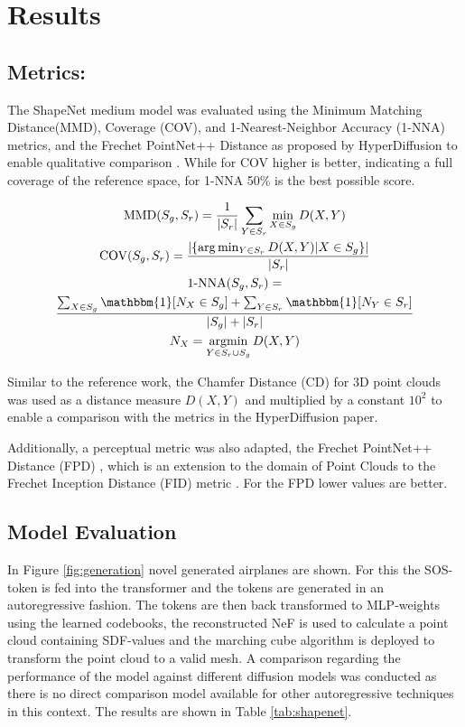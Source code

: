 


\section{Results}

\subsection*{Metrics: }

The ShapeNet medium model was evaluated using the Minimum Matching Distance(MMD), Coverage (COV), and 1-Nearest-Neighbor Accuracy (1-NNA) metrics, and the Frechet PointNet++ Distance as proposed by HyperDiffusion to enable qualitative comparison \cite{erkoç2023hyperdiffusion}.
While for COV higher is better, indicating a full coverage of the reference space, for 1-NNA 50\% is the best possible score.

\begin{gather*}
  \mathrm{MMD}(S_g,S_r) =\frac{1}{|S_{r}|}\sum_{Y\in S_{r}}\min_{X\in S_{g}}D(X,Y)\\
  \text{COV}(S_g,S_r) =\frac{|\{\arg\min_{Y\in S_r}D(X,Y)|X\in S_g\}|}{|S_r|}\\
  \text{1-NNA}(S_g,S_r) =\\
  \frac{\sum_{X\in S_g}\mathbbm{1}[N_X\in S_g]+\sum_{Y\in S_r}\mathbbm{1}[N_Y\in S_r]}{|S_g|+|S_r|}\\
  N_X = \underset{Y\in S_r \cup S_g}{\text{argmin}} \, D(X,Y) \\
\end{gather*}

Similar to the reference work, the Chamfer Distance (CD) for 3D point clouds was used as a distance measure $D(X, Y)$ and multiplied by a constant $10^2$ to enable a comparison with the metrics in the HyperDiffusion paper.

Additionally, a perceptual metric was also adapted, the Frechet PointNet++ Distance (FPD) \cite{qi2017pointnetdeephierarchicalfeature}, which is an extension to the domain of Point Clouds to the Frechet Inception Distance (FID) metric \cite{NIPS2017_8a1d6947}. For the FPD lower values are better.

\subsection*{Model Evaluation}
In Figure \ref{fig:generation} novel generated airplanes are shown. For this the SOS-token is fed into the transformer and the tokens are generated in an autoregressive fashion. The tokens are then back transformed to MLP-weights using the learned codebooks, the reconstructed NeF is used to calculate a point cloud containing SDF-values and the marching cube algorithm is deployed to transform the point cloud to a valid mesh.
A comparison regarding the performance of the model against different diffusion models was conducted as there is no direct comparison model available for other autoregressive techniques in this context. The results are shown in Table \ref{tab:shapenet}.

